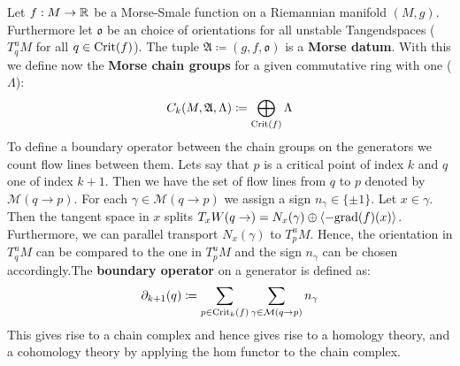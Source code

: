 




\begin{definition}\label{def: Morse homology}
	Let $f:M\to \mathbb{R}$ be a Morse-Smale function on a Riemannian manifold $(M,g)$. Furthermore let $\mathfrak{o}$ be an choice of orientations for all unstable Tangendspaces ($T_q^uM$ for all $q\in \mathrm{Crit}(f)$). The tuple $\mathfrak{A}\coloneq (g,f,\mathfrak{o})$ is a \textbf{Morse datum}. With this we define now the \textbf{Morse chain groups} for a given commutative ring with one ($\Lambda$): 
	\begin{equation*}
		C_k(M,\mathfrak{A},\Lambda)\coloneq \bigoplus_{\mathrm{Crit}(f)}\Lambda
	\end{equation*} 
	To define a boundary operator between the chain groups on the generators we count flow lines between them.
	Lets say that $p$ is a critical point of index $k$ and $q$ one of index $k+1$. Then we have the set of flow lines from $q$ to $p$ denoted by $\mathcal{M}(q\to p)$. For each $\gamma\in \mathcal{M}(q\to p)$ we assign a sign $n_\gamma\in \{\pm 1\}$. Let $x\in \gamma$. Then the tangent space in $x$ splits $T_xW(q\to)=N_x(\gamma)\oplus \langle -\mathrm{grad}(f)(x)\rangle$. Furthermore, we can parallel transport $N_x(\gamma)$ to $T^u_pM$. Hence, the orientation in $T_q^uM$ can be compared to the one in $T^u_pM$ and the sign $n_\gamma$ can be chosen accordingly.The \textbf{boundary operator} on a generator is defined as:
	\begin{equation*}
		\partial_{k+1}(q)\coloneq \sum_{p\in \mathrm{Crit}_k(f)} \sum_{\gamma\in \mathcal{M}(q\to p)} n_\gamma
	\end{equation*}
	This gives rise to a chain complex and hence gives rise to a homology theory, and a cohomology theory by applying the hom functor to the chain complex.
\end{definition}
